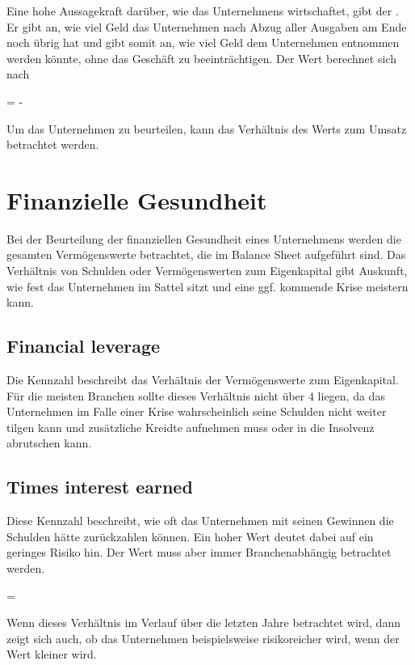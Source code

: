 Eine hohe Aussagekraft darüber, wie das Unternehmens wirtschaftet, gibt der \textbf{\freeCashFlow}.
Er gibt an, wie viel Geld das Unternehmen nach Abzug aller Ausgaben am Ende noch übrig hat und gibt somit an, wie viel Geld dem Unternehmen entnommen werden könnte, ohne das Geschäft zu beeinträchtigen.
Der Wert berechnet sich nach
\begin{formel}
     =  - 
\end{formel}
Um das Unternehmen zu beurteilen, kann das Verhältnis des Werts zum Umsatz betrachtet werden.

%
\section{Finanzielle Gesundheit}

Bei der Beurteilung der finanziellen Gesundheit eines Unternehmens werden die gesamten Vermögenswerte betrachtet, die im Balance Sheet aufgeführt sind.
Das Verhältnis von Schulden oder Vermögenswerten zum Eigenkapital gibt Auskunft, wie fest das Unternehmen im Sattel sitzt und eine ggf. kommende Krise meistern kann.

%
\subsection{Financial leverage}

Die Kennzahl beschreibt das Verhältnis der Vermögenswerte zum Eigenkapital. 
Für die meisten Branchen sollte dieses Verhältnis nicht über 4 liegen, da das Unternehmen im Falle einer Krise wahrscheinlich seine Schulden nicht weiter tilgen kann und zusätzliche Kreidte aufnehmen muss oder in die Insolvenz abrutschen kann.

%
\subsection{Times interest earned}

Diese Kennzahl beschreibt, wie oft das Unternehmen mit seinen Gewinnen die Schulden hätte zurückzahlen können. 
Ein hoher Wert deutet dabei auf ein geringes Risiko hin. 
Der Wert muss aber immer Branchenabhängig betrachtet werden.
\begin{formel}
     = 
\end{formel}
Wenn dieses Verhältnis im Verlauf über die letzten Jahre betrachtet wird, dann zeigt sich auch, ob das Unternehmen beispielsweise risikoreicher wird, wenn der Wert kleiner wird.\\

